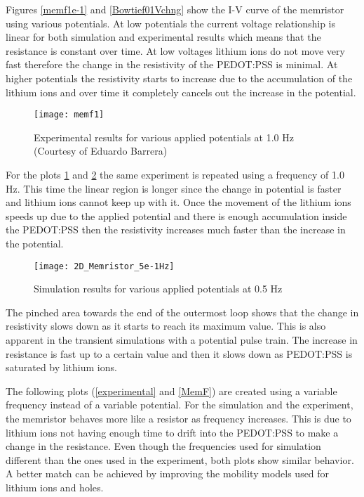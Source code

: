 \begin{doublespace}
Figures \ref{memf1e-1} and \ref{Bowtief01Vchng} show the I-V curve of the memristor using various potentials. At low potentials the current voltage relationship is linear for both simulation and experimental results which means that the resistance is constant over time. At low voltages lithium ions do not move very fast therefore the change in the resistivity of the PEDOT:PSS is minimal. At higher potentials the resistivity starts to increase due to the accumulation of the lithium ions and over time it completely cancels out the increase in the potential. 

\begin{figure}[!htp]
\centering
\texttt{[image: memf1]}
\caption{Experimental results for various applied potentials at 1.0 Hz (Courtesy of Eduardo Barrera)\cite{eduardo2}} 
\label{memf1}
\end{figure}

For the plots \ref{memf1} and \ref{2D_Memristor_5e-1Hz} the same experiment is repeated using a frequency of 1.0 Hz. This time the linear region is longer since the change in potential is faster and lithium ions cannot keep up with it. Once the movement of the lithium ions speeds up due to the applied potential and there is enough accumulation inside the PEDOT:PSS then the resistivity increases much faster than the increase in the potential. 

\begin{figure}[!htp]
\centering
\texttt{[image: 2D\_Memristor\_5e-1Hz]}
\caption{Simulation results for various applied potentials at 0.5 Hz}
\label{2D_Memristor_5e-1Hz}
\end{figure}

The pinched area towards the end of the outermost loop shows that the change in resistivity slows down as it starts to reach its maximum value. This is also apparent in the transient simulations with a potential pulse train. The increase in resistance is fast up to a certain value and then it slows down as PEDOT:PSS is saturated by lithium ions.

The following plots (\ref{experimental} and \ref{MemF}) are created using a variable frequency instead of a variable potential. For the simulation and the experiment, the memristor behaves more like a resistor as frequency increases. This is due to lithium ions not having enough time to drift into the PEDOT:PSS to make a change in the resistance. Even though the frequencies used for simulation  different than the ones used in the experiment, both plots show similar behavior. A better match can  be achieved by improving the mobility models used for lithium ions and holes. 


\end{doublespace}
